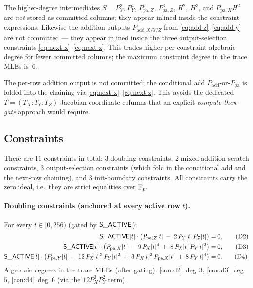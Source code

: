 \begin{remark}\label{rem:inlined}
The higher-degree intermediates $S = P_Y^2$, $P_Y^4$, $P_{\mathrm{pa},Z}^2$,
$P_{\mathrm{pa},Z}^3$, $H^2$, $H^3$, and $P_{\mathrm{pa},X} H^2$ are
\emph{not} stored as committed columns; they appear inlined inside
the constraint expressions. Likewise the addition outputs
$P_{\mathrm{add}, X/Y/Z}$ from \eqref{eq:add-z}--\eqref{eq:add-y} are
not committed — they appear inlined inside the three
output-selection constraints \eqref{eq:next-x}--\eqref{eq:next-z}.
This trades higher per-constraint algebraic degree for fewer
committed columns; the maximum constraint degree in the trace
MLEs is~$6$.
\end{remark}

\begin{remark}
\label{rem:no-add-witness}
The per-row addition output is not committed; the conditional add
$P_{\mathrm{add}}$-or-$P_{\mathrm{pa}}$ is folded into the
chaining via \eqref{eq:next-x}--\eqref{eq:next-z}. This avoids
the dedicated $T = (T_X : T_Y : T_Z)$ Jacobian-coordinate columns that an
explicit \emph{compute-then-gate} approach would require.
\end{remark}

\subsection{Constraints}\label{sec:constraints}

There are $11$ constraints in total: $3$ doubling constraints, $2$
mixed-addition scratch constraints, $3$ output-selection constraints
(which fold in the conditional add and the next-row chaining), and
$3$ init-boundary constraints. All constraints carry the zero ideal,
i.e.\ they are strict equalities over $\mathbb{F}_p$.

\paragraph{Doubling constraints (anchored at every active row $t$).}

For every $t \in [0, 256)$ (gated by $\mathsf{S\_ACTIVE}$):
\begin{align}
\mathsf{S\_ACTIVE}[t] \cdot \bigl(P_{\mathrm{pa},Z}[t] \;-\; 2\, P_Y[t]\, P_Z[t]\bigr) &= 0,\tag{D2}\label{con:d2}\\
\mathsf{S\_ACTIVE}[t] \cdot \bigl(P_{\mathrm{pa},X}[t] \;-\; 9\, P_X[t]^4 \;+\; 8\, P_X[t]\, P_Y[t]^2\bigr) &= 0,\tag{D3}\label{con:d3}\\
\mathsf{S\_ACTIVE}[t] \cdot \bigl(P_{\mathrm{pa},Y}[t] \;-\; 12\, P_X[t]^3\, P_Y[t]^2 \;+\; 3\, P_X[t]^2\, P_{\mathrm{pa},X}[t] \;+\; 8\, P_Y[t]^4\bigr) &= 0.\tag{D4}\label{con:d4}
\end{align}
Algebraic degrees in the trace MLEs (after gating): \ref{con:d2}~deg~$3$, \ref{con:d3}~deg~$5$, \ref{con:d4}~deg~$6$ (via the $12 P_X^3 P_Y^2$ term).

